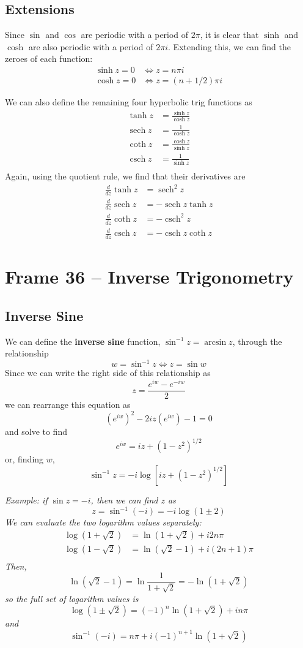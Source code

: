 \documentclass{article}
\renewcommand{\emph}{\textbf}
\DeclareMathOperator{\sech}{sech}
\DeclareMathOperator{\csch}{csch}
\begin{document}
\subsection{Extensions}
Since $\sin$ and $\cos$ are periodic with a period of $2\pi$, it is clear that $\sinh$ and $\cosh$ are also periodic with a period of $2\pi i$. Extending this, we can find the zeroes of each function:
\begin{align*}
	\sinh z = 0 &\iff z = n\pi i \\
	\cosh z = 0 &\iff z = (n + 1/2) \pi i
\end{align*}

We can also define the remaining four hyperbolic trig functions as
\begin{align*}
	\tanh z &= \frac{\sinh z}{\cosh z} \\
	\sech z &= \frac{1}{\cosh z} \\
	\coth z &= \frac{\cosh z}{\sinh z} \\
	\csch z &= \frac{1}{\sinh z} \\
\end{align*}
Again, using the quotient rule, we find that their derivatives are
\begin{align*}
	\frac{d}{dz} \tanh z &= \sech^2 z \\
	\frac{d}{dz} \sech z &= - \sech z \tanh z \\
	\frac{d}{dz} \coth z &= - \csch^2 z \\
	\frac{d}{dz} \csch z &= - \csch z \coth z
\end{align*}


\clearpage
\section{Frame 36 -- Inverse Trigonometry}
\subsection{Inverse Sine}
We can define the \emph{inverse sine} function, $\sin^{-1} z = \arcsin z$, through the relationship
\[
	w = \sin^{-1} z \iff z = \sin w
\]
Since we can write the right side of this relationship as
\[
	z = \frac{e^{iw} - e^{-iw}}{2}
\]
we can rearrange this equation as
\[
	(e^{iw})^2 - 2iz(e^{iw}) - 1 = 0
\]
and solve to find
\[
	e^{iw} = iz + (1 - z^2)^{1/2}
\]
or, finding $w$,
\[
	\sin^{-1} z = -i \log[iz + (1 - z^2)^{1/2}]
\]

\textit{Example: if $\sin z = -i$, then we can find $z$ as
\[
	z = \sin^{-1}(-i) = -i \log(1 \pm 2)
\]
We can evaluate the two logarithm values separately:
\begin{align*}
	\log(1 + \sqrt{2}) &= \ln(1 + \sqrt{2}) + i 2n\pi \\
	\log(1 - \sqrt{2}) &= \ln(\sqrt{2} - 1) + i(2n + 1) \pi \\
\end{align*}
Then,
\[
	\ln(\sqrt{2} - 1) = \ln \frac{1}{1 + \sqrt{2}} = -\ln(1 + \sqrt{2})
\]
so the full set of logarithm values is
\[
	\log(1 \pm \sqrt{2}) = (-1)^n \ln(1 + \sqrt{2}) + i n\pi
\]
and
\[
	\sin^{-1}(-i) = n\pi + i(-1)^{n+1} \ln(1 + \sqrt{2})
\]
}
\end{document}
